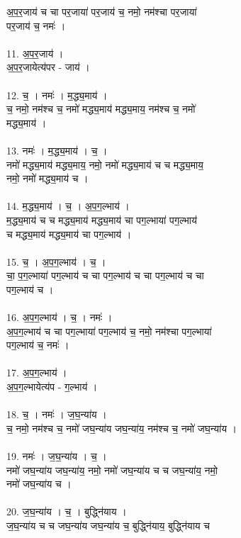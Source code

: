 अ॒प॒र॒जाय॑ च चा पर॒जाया॑ पर॒जाय॑ च॒ नमो॒ नम॑श्चा पर॒जाया॑\\
पर॒जाय॑ च॒ नमः॑ ।\\
\\
11. अ॒प॒र॒जाय॑ ।\\
अ॒प॒र॒जायेत्य॑पर - जाय॑ ।\\
\\
12. च॒ । नमः॑ । म॒द्ध्य॒माय॑ ।\\
च॒ नमो॒ नम॑श्च च॒ नमो॑ मद्ध्य॒माय॑ मद्ध्य॒माय॒ नम॑श्च च॒ नमो॑\\
मद्ध्य॒माय॑ ।\\
\\
13. नमः॑ । म॒द्ध्य॒माय॑ । च॒ ।\\
नमो॑ मद्ध्य॒माय॑ मद्ध्य॒माय॒ नमो॒ नमो॑ मद्ध्य॒माय॑ च च मद्ध्य॒माय॒\\
नमो॒ नमो॑ मद्ध्य॒माय॑ च ।\\
\\
14. म॒द्ध्य॒माय॑ । च॒ । अ॒प॒ग॒ल्भाय॑ ।\\
म॒द्ध्य॒माय॑ च च मद्ध्य॒माय॑ मद्ध्य॒माय॑ चा पग॒ल्भाया॑ पग॒ल्भाय॑\\
च मद्ध्य॒माय॑ मद्ध्य॒माय॑ चा पग॒ल्भाय॑ ।\\
\\
15. च॒ । अ॒प॒ग॒ल्भाय॑ । च॒ ।\\
चा॒ प॒ग॒ल्भाया॑ पग॒ल्भाय॑ च चा पग॒ल्भाय॑ च चा पग॒ल्भाय॑ च चा\\
पग॒ल्भाय॑ च ।\\
\\
16. अ॒प॒ग॒ल्भाय॑ । च॒ । नमः॑ ।\\
अ॒प॒ग॒ल्भाय॑ च चा पग॒ल्भाया॑ पग॒ल्भाय॑ च॒ नमो॒ नम॑श्चा पग॒ल्भाया॑\\
पग॒ल्भाय॑ च॒ नमः॑ ।\\
\\
17. अ॒प॒ग॒ल्भाय॑ ।\\
अ॒प॒ग॒ल्भायेत्य॑प - ग॒ल्भाय॑ ।\\
\\
18. च॒ । नमः॑ । ज॒घ॒न्या॑य ।\\
च॒ नमो॒ नम॑श्च च॒ नमो॑ जघ॒न्या॑य जघ॒न्या॑य॒ नम॑श्च च॒ नमो॑ जघ॒न्या॑य ।\\
\\
19. नमः॑ । ज॒घ॒न्या॑य । च॒ ।\\
नमो॑ जघ॒न्या॑य जघ॒न्या॑य॒ नमो॒ नमो॑ जघ॒न्या॑य च च जघ॒न्या॑य॒ नमो॒\\
नमो॑ जघ॒न्या॑य च ।\\
\\
20. ज॒घ॒न्या॑य । च॒ । बुद्ध्नि॑याय ।\\
ज॒घ॒न्या॑य च च जघ॒न्या॑य जघ॒न्या॑य च॒ बुद्ध्नि॑याय॒ बुद्ध्नि॑याय च\\
